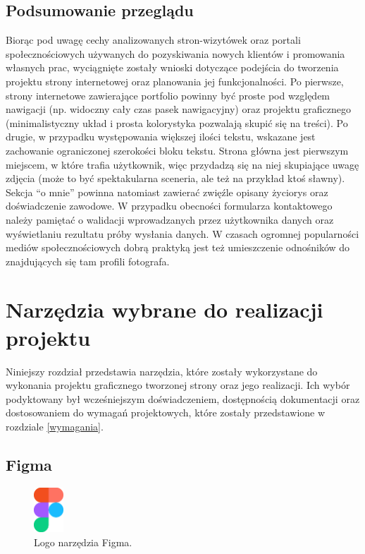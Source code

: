 \documentclass[12pt]{article}
\numberwithin{figure}{section}
\begin{document}
\begin{sloppypar}
\subsection{Podsumowanie przeglądu}

Biorąc pod uwagę cechy analizowanych stron-wizytówek oraz portali społecznościowych używanych do pozyskiwania nowych klientów i promowania własnych prac, wyciągnięte zostały wnioski dotyczące podejścia do tworzenia projektu strony internetowej oraz planowania jej funkcjonalności. Po pierwsze, strony internetowe zawierające portfolio powinny być proste pod względem nawigacji (np. widoczny cały czas pasek nawigacyjny) oraz projektu graficznego (minimalistyczny układ i prosta kolorystyka pozwalają skupić się na treści). Po drugie, w przypadku występowania większej ilości tekstu, wskazane jest zachowanie ograniczonej szerokości bloku tekstu. Strona główna jest pierwszym miejscem, w które trafia użytkownik, więc przydadzą się na niej skupiające uwagę zdjęcia (może to być spektakularna sceneria, ale też na przykład ktoś sławny). Sekcja ``o mnie'' powinna natomiast zawierać zwięźle opisany życiorys oraz doświadczenie zawodowe. W przypadku obecności formularza kontaktowego należy pamiętać o walidacji wprowadzanych przez użytkownika danych oraz wyświetlaniu rezultatu próby wysłania danych. W czasach ogromnej popularności mediów społecznościowych dobrą praktyką jest też umieszczenie odnośników do znajdujących się tam profili fotografa.


\newpage 

\section{Narzędzia wybrane do realizacji projektu}

Niniejszy rozdział przedstawia narzędzia, które zostały wykorzystane do wykonania projektu graficznego tworzonej strony oraz jego realizacji. Ich wybór podyktowany był wcześniejszym doświadczeniem, dostępnością dokumentacji oraz dostosowaniem do wymagań projektowych, które zostały przedstawione w rozdziale \ref{wymagania}.

\subsection*{Figma}

\begin{figure}[H] 
    \centering
        \includegraphics[width=0.1\textwidth]{images/figma-logo.png}
   \caption{Logo narzędzia Figma.}
\end{figure}



\end{sloppypar}
\end{document}
